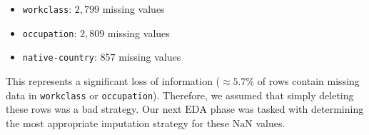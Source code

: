 \begin{itemize}
    \item \texttt{workclass}: $2,799$ missing values
    \item \texttt{occupation}: $2,809$ missing values
    \item \texttt{native-country}: $857$ missing values
\end{itemize}
This represents a significant loss of information ($\approx 5.7\%$ of rows contain missing data in \texttt{workclass} or \texttt{occupation}). Therefore, we assumed that simply deleting these rows was a bad strategy. Our next $\text{EDA}$ phase was tasked with determining the most appropriate imputation strategy for these $\text{NaN}$ values.

\vspace{2 \baselineskip}